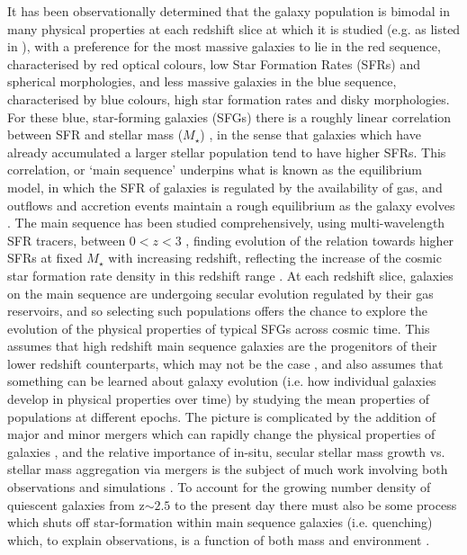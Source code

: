\documentclass[fleqn,usenatbib]{mn2e}
\begin{document}
It has been observationally determined that the galaxy population is bimodal in many physical properties at each redshift slice at which it is studied (e.g. as listed in \cite{Dekel2006}), with a preference for the most massive galaxies to lie in the red sequence, characterised by red optical colours, low Star Formation Rates (SFRs) and spherical morphologies, and less massive galaxies in the blue sequence, characterised by blue colours, high star formation rates and disky morphologies. 
For these blue, star-forming galaxies (SFGs) there is a roughly linear correlation between SFR and stellar mass ($M_{\star}$) \citep[e.g.][]{Daddi2007,Noeske2007,Elbaz2007}, in the sense that galaxies which have already accumulated a larger stellar population tend to have higher SFRs.
This correlation, or `main sequence' underpins what is known as the equilibrium model, in which the SFR of galaxies is regulated by the availability of gas, and outflows and accretion events maintain a rough equilibrium as the galaxy evolves \citep[e.g.][]{Dave2012,Lilly2013,Saintonge2013}.
The main sequence has been studied comprehensively, using multi-wavelength SFR tracers, between $0 < z < 3$ \citep[e.g.][]{Rodighiero2011,Karim2011,Whitaker2012,Behroozi2013b,Whitaker2014,Rodighiero2014,Speagle2014,Pannella2014,Sparre2015,Lee2015,Schreiber2015,Renzini2015,Nelson2016}, finding evolution of the relation towards higher SFRs at fixed $M_{\star}$ with increasing redshift, reflecting the increase of the cosmic star formation rate density in this redshift range \citep{Madau_2014}.
At each redshift slice, galaxies on the main sequence are undergoing secular evolution regulated by their gas reservoirs, and so selecting such populations offers the chance to explore the evolution of the physical properties of typical SFGs across cosmic time.
This assumes that high redshift main sequence galaxies are the progenitors of their lower redshift counterparts, which may not be the case \citep[e.g.][]{Gladders2013,Kelson2014,Abramson2016b}, and also assumes that something can be learned about galaxy evolution (i.e. how individual galaxies develop in physical properties over time) by studying the mean properties of populations at different epochs.
The picture is complicated by the addition of major and minor mergers which can rapidly change the physical properties of galaxies \citep[e.g.][]{Toomre1977,Lotz2008,Conselice2011,Conselice2014}, and the relative importance of in-situ, secular stellar mass growth vs. stellar mass aggregation via mergers is the subject of much work involving both observations and simulations \citep[e.g.][]{Robaina2009,Kaviraj2012,Stott2013,Lofthouse2016,Qu2016}. 
To account for the growing number density of quiescent galaxies from z$\sim 2.5$ to the present day \citep[e.g.][]{Bell2004,Faber2007,Brown2007,Ilbert2010,Brammer2011,Muzzin2013,Buitrago2013} there must also be some process which shuts off star-formation within main sequence galaxies (i.e. quenching) which, to explain observations, is a function of both mass and environment \citep{Peng2010}.
\end{document}

